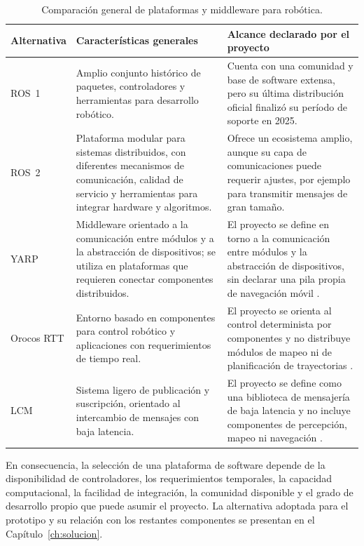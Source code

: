 \begin{table}[htbp]
\centering
\caption{Comparación general de plataformas y middleware para robótica.}
\label{tab:comparativa_middleware}
\small
\begin{tabular}{P{2.1cm} P{5.4cm} P{6.3cm}}
\toprule
\textbf{Alternativa} &
\textbf{Características generales} &
\textbf{Alcance declarado por el proyecto} \\
\midrule

ROS~1 &
Amplio conjunto histórico de paquetes, controladores y herramientas para
desarrollo robótico. &
Cuenta con una comunidad y base de software extensa, pero su última
distribución oficial finalizó su período de soporte en 2025.
\citep{ros_noetic_eol} \\

ROS~2 &
Plataforma modular para sistemas distribuidos, con diferentes mecanismos de
comunicación, calidad de servicio y herramientas para integrar hardware y
algoritmos. &
Ofrece un ecosistema amplio, aunque su capa de comunicaciones puede requerir
ajustes, por ejemplo para transmitir mensajes de gran tamaño.
\citep{macenski2022ros2} \\

YARP &
Middleware orientado a la comunicación entre módulos y a la abstracción de
dispositivos; se utiliza en plataformas que requieren conectar componentes
distribuidos. &
El proyecto se define en torno a la comunicación entre módulos y la
abstracción de dispositivos, sin declarar una pila propia de navegación
móvil \citep{yarp_docs}. \\

Orocos RTT &
Entorno basado en componentes para control robótico y aplicaciones con
requerimientos de tiempo real. &
El proyecto se orienta al control determinista por componentes y no
distribuye módulos de mapeo ni de planificación de trayectorias
\citep{orocos_rtt}.\\

LCM &
Sistema ligero de publicación y suscripción, orientado al intercambio de
mensajes con baja latencia. &
El proyecto se define como una biblioteca de mensajería de baja latencia y
no incluye componentes de percepción, mapeo ni navegación
\citep{lcm_docs}.\\

\bottomrule
\end{tabular}
\end{table}
En consecuencia, la selección de una plataforma de software depende de la
disponibilidad de controladores, los requerimientos temporales, la capacidad
computacional, la facilidad de integración, la comunidad disponible y el
grado de desarrollo propio que puede asumir el proyecto. La alternativa
adoptada para el prototipo y su relación con los restantes componentes se
presentan en el Capítulo~\ref{ch:solucion}.


